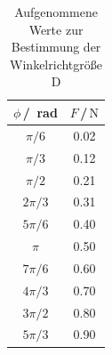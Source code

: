 \begin{table}[H]
\normalsize

\centering
{}
\begin{tabular}{c c}
\toprule
    $\phi$\,/\, rad & $F$\,/\,$\si{\newton}$ \\
    \midrule

$\pi/6$  &   0.02   \\
$\pi/3$  &   0.12   \\
$\pi/2$  &   0.21   \\
$2\pi/3$ &   0.31   \\
$5\pi/6$ &   0.40   \\
$\pi$    &   0.50   \\
$7\pi/6$ &   0.60   \\
$4\pi/3$ &   0.70   \\
$3\pi/2$ &   0.80   \\
$5\pi/3$ &   0.90   \\ 

    \bottomrule
\end{tabular}
\caption{Aufgenommene Werte zur Bestimmung der Winkelrichtgröße D}
\label{tab:a1}
\end{table}















